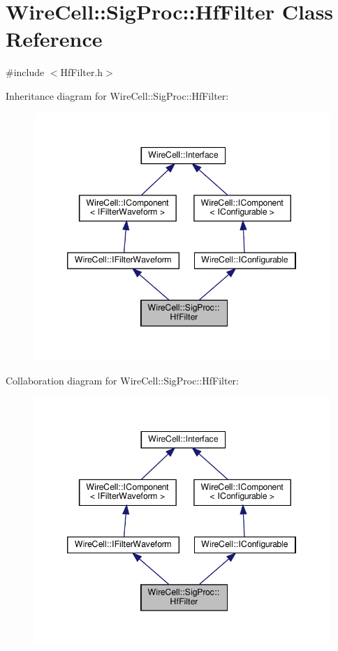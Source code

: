 \hypertarget{class_wire_cell_1_1_sig_proc_1_1_hf_filter}{}\section{Wire\+Cell\+:\+:Sig\+Proc\+:\+:Hf\+Filter Class Reference}
\label{class_wire_cell_1_1_sig_proc_1_1_hf_filter}


{\ttfamily \#include $<$Hf\+Filter.\+h$>$}



Inheritance diagram for Wire\+Cell\+:\+:Sig\+Proc\+:\+:Hf\+Filter\+:
\nopagebreak
\begin{figure}[H]
\begin{center}
\leavevmode
\includegraphics[width=346pt]{class_wire_cell_1_1_sig_proc_1_1_hf_filter__inherit__graph}
\end{center}
\end{figure}


Collaboration diagram for Wire\+Cell\+:\+:Sig\+Proc\+:\+:Hf\+Filter\+:
\nopagebreak
\begin{figure}[H]
\begin{center}
\leavevmode
\includegraphics[width=346pt]{class_wire_cell_1_1_sig_proc_1_1_hf_filter__coll__graph}
\end{center}
\end{figure}
